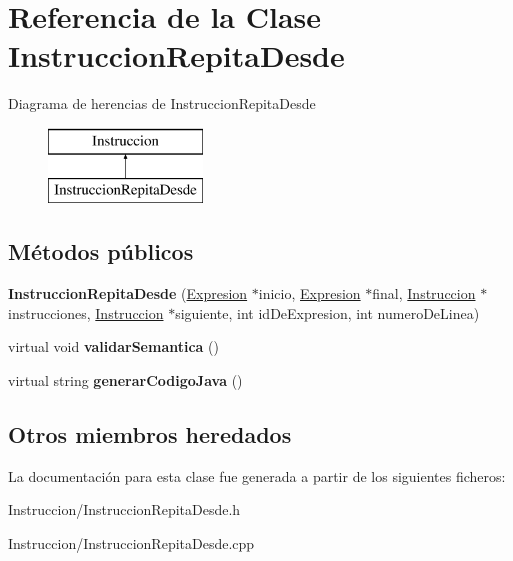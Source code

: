 \hypertarget{class_instruccion_repita_desde}{\section{Referencia de la Clase Instruccion\-Repita\-Desde}
\label{class_instruccion_repita_desde}
}
Diagrama de herencias de Instruccion\-Repita\-Desde\begin{figure}[H]
\begin{center}
\leavevmode
\includegraphics[height=2.000000cm]{class_instruccion_repita_desde}
\end{center}
\end{figure}
\subsection*{Métodos públicos}
\begin{DoxyCompactItemize}
\item 
\hypertarget{class_instruccion_repita_desde_af26800cd1eb9f21b41b91c57927cd582}{{\bfseries Instruccion\-Repita\-Desde} (\hyperlink{class_expresion}{Expresion} $\ast$inicio, \hyperlink{class_expresion}{Expresion} $\ast$final, \hyperlink{class_instruccion}{Instruccion} $\ast$instrucciones, \hyperlink{class_instruccion}{Instruccion} $\ast$siguiente, int id\-De\-Expresion, int numero\-De\-Linea)}\label{class_instruccion_repita_desde_af26800cd1eb9f21b41b91c57927cd582}

\item 
\hypertarget{class_instruccion_repita_desde_af4405f4e81b9bc73d27623c68c096ce5}{virtual void {\bfseries validar\-Semantica} ()}\label{class_instruccion_repita_desde_af4405f4e81b9bc73d27623c68c096ce5}

\item 
\hypertarget{class_instruccion_repita_desde_acd4ade3e3b7a86f242ec87401fe4cd1f}{virtual string {\bfseries generar\-Codigo\-Java} ()}\label{class_instruccion_repita_desde_acd4ade3e3b7a86f242ec87401fe4cd1f}

\end{DoxyCompactItemize}
\subsection*{Otros miembros heredados}


La documentación para esta clase fue generada a partir de los siguientes ficheros\-:\begin{DoxyCompactItemize}
\item 
Instruccion/Instruccion\-Repita\-Desde.\-h\item 
Instruccion/Instruccion\-Repita\-Desde.\-cpp\end{DoxyCompactItemize}
